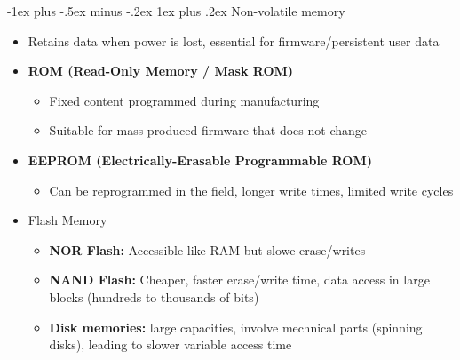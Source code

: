 \documentclass[10pt,landscape]{article}
\makeatletter
\newcommand{\subsubsubsection}{\@startsection{subsubsection}{3}{0mm}%
                                {-1ex plus -.5ex minus -.2ex}%
                                {1ex plus .2ex}%
                                {\normalfont\scriptsize\bfseries}}
\newcommand{\1}{\mathmybb{1}}
\makeatother
\begin{document}
\begin{multicols*}{3}
\subsubsubsection{Non-volatile memory}
\begin{itemize}
  \item Retains data when power is lost, essential for firmware/persistent user data
  \item \textbf{ROM (Read-Only Memory / Mask ROM)}
  \begin{itemize}
    \item Fixed content programmed during manufacturing
    \item Suitable for mass-produced firmware that does not change
  \end{itemize}
  \item \textbf{EEPROM (Electrically-Erasable Programmable ROM)}
  \begin{itemize}
    \item Can be reprogrammed in the field, longer write times, limited write cycles
  \end{itemize}
  \item Flash Memory
  \begin{itemize}
    \item \textbf{NOR Flash:} Accessible like RAM but slowe erase/writes
    \item \textbf{NAND Flash:} Cheaper, faster erase/write time, data access in large blocks (hundreds to thousands of bits)
    \item \textbf{Disk memories:} large capacities, involve mechnical parts (spinning disks), leading to slower variable access time
  \end{itemize}
\end{itemize}


\end{multicols*}
\end{document}

